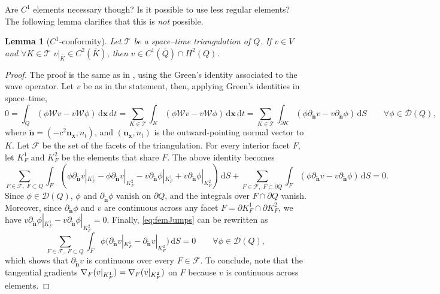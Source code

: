 \documentclass[a4paper]{article}
\theoremstyle{plain}
\newtheorem{lemma}[theorem]{Lemma}
\theoremstyle{definition}
\newcommand{\operator}[1]{\mathcal{#1}}
\newcommand{\dx}{{\,\mathrm{d}\vect x}}
\newcommand{\dt}{{\,\mathrm{d}t}}
\newcommand{\dS}{{\,\mathrm{d}S}}
\newcommand{\Grad}[1]{\nabla #1}
\newcommand{\vect}[1]{\bm{#1}}
\newcommand{\oW}{{\operator{W}}}
\newcommand{\vx}{{\vect x}}
\newcommand{\vn}{{\vect n}}
\begin{document}
Are $C^1$ elements necessary though? Is it possible to use less regular elements? The following lemma clarifies that this is \textit{not} possible.
\begin{lemma}[$C^1$-conformity]
	\label{lemma:C1conformity}
	Let $\mathcal T$ be a space--time triangulation of $Q$. If $v \in V$ and $\forall K \in \mathcal T$ $v|_{\overline{K}} \in C^2(\overline{K})$, then $v \in C^1(\overline{Q}) \cap H^2(Q)$.
\end{lemma}
\begin{proof}
	The proof is the same as in \cite[Lemma~5.1]{Moiola2014}, using the Green's identity associated to the wave operator.
Let $v$ be as in the statement, then, applying Green's identities in space--time,
$$
	0=\int_Q (\phi \oW v - v \oW \phi) \dx\dt
	 =\sum_{K\in \mathcal T}\int_K (\phi \oW v - v \oW \phi) \dx\dt
	 =\sum_{K\in \mathcal T} \int_{\partial K} \left(\phi \partial_{\widetilde{\vn}} v - v \partial_{\widetilde{\vn}}\phi \right) \dS
	 \qquad\forall\phi \in \mathcal D(Q),
	$$
	where $\widetilde{\vn} = (-c^2\vn_{\vx}, n_t)$, and $(\vn_{\vx}, n_t)$ is the outward-pointing normal vector to $K$.
	Let $\mathcal F$ be the set of the facets of the triangulation.
	For every interior facet $F$, let $K^1_F$ and $K^2_F$ be the elements that share $F$.
	The above identity becomes
\begin{equation}
		\label{eq:femJumps}
		\sum_{F\in\mathcal F,\; F\subset Q} \int_F \left(\phi \partial_{\widetilde{\vn}}v|_{K^1_F} - \phi \partial_{\widetilde{\vn}}v|_{K^2_F} - v\partial_{\widetilde{\vn}} \phi|_{K^1_F} + v\partial_{\widetilde{\vn}}\phi|_{K^2_F} \right)\dS
		+ \sum_{F\in\mathcal F,\; F\subset \partial Q}\int_{F} \left(\phi \partial_{\widetilde{\vn}}v - v \partial_{\widetilde{\vn}} \phi \right)\dS= 0.
	\end{equation}
	Since $\phi \in \mathcal D(Q)$, $\phi$ and $\partial_{\widetilde{\vn}} \phi$ vanish on $\partial Q$, and
	the integrals over $F\cap \partial Q$ vanish.
	Moreover, since $\partial_{\widetilde{\vn}}\phi$ and $v$ are continuous across any facet $F=\partial K^1_F\cap \partial K^2_F$,
	we have $v\partial_{\widetilde{\vn}} \phi|_{K^1_F} - v\partial_{\widetilde{\vn}}\phi|_{K^2_F}=0$.
Finally, \eqref{eq:femJumps} can be rewritten as
	\begin{equation*}
		\sum_{F\in\mathcal F,\; F\subset Q}\int_{F} \phi \big(\partial_{\widetilde{\vn}}v|_{K^1_F} - \partial_{\widetilde{\vn}}v|_{K^2_F} \big)\dS = 0
		 \qquad\forall\phi \in \mathcal D(Q),
	\end{equation*}
	which shows that $\partial_{\widetilde{\vn}} v$ is continuous over every $F\in\mathcal F$. To conclude, note that the tangential gradients $\Grad_F (v|_{K^1_F}) = \Grad_F (v|_{K^2_F})$ on $F$ because $v$ is continuous across elements.
\end{proof}
\end{document}
